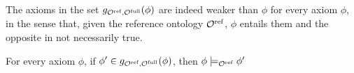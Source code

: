 \documentclass[
]{ceurart}
\begin{document}
The axioms in the set $g_{{\mathcal{O}^\textnormal{ref}},{\mathcal{O}^\textnormal{full}}}(\phi)$ are indeed weaker than $\phi$ for every axiom $\phi$, in the sense that, given the reference ontology ${\mathcal{O}^\textnormal{ref}}$, $\phi$ entails them and the opposite in not necessarily true.

\begin{lemma} \label{lem:weaker}
  For every \SROIQ axiom $\phi$, if $\phi' \in g_{{\mathcal{O}^\textnormal{ref}},{\mathcal{O}^\textnormal{full}}}(\phi)$, then $\phi \models_{\mathcal{O}^\textnormal{ref}} \phi'$
\end{lemma}

\end{document}
